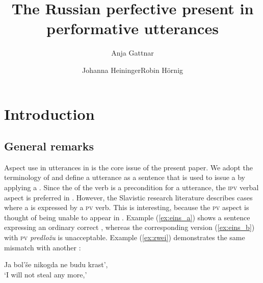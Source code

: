 \documentclass[output=paper,colorlinks,citecolor=brown,newtxmath,hidelinks]{langscibook}
\title{The Russian perfective present in performative utterances}
\author{Anja Gattnar\affiliation{University of Tübingen}\and  Johanna Heininger\affiliation{University of Tübingen}\lastand  Robin Hörnig\affiliation{University of Tübingen}}
\begin{document}
\maketitle
{}
%

\section{Introduction}

\subsection{General remarks}
Aspect use in  utterances in  is the core issue of the present paper. We adopt the terminology of \citet{Eckardt2012} and define a  utterance as a sentence that is used to issue a  by applying a . Since the  of the verb is a precondition for a  utterance, the \textsc{ipv} verbal aspect is preferred in . However, the Slavistic research literature describes cases where a  is expressed by a \textsc{pv} verb. This is interesting, because the \textsc{pv} aspect is thought of being unable to appear in . Example (\ref{ex:eins_a}) shows a sentence expressing an ordinary correct , whereas the corresponding version (\ref{ex:eins_b}) with \textsc{pv} \textit{predložu} is unacceptable. Example (\ref{ex:zwei}) demonstrates the same mismatch with another :

\ea\label{ex:eins}
           \z
\z

\ea\label{ex:zwei} Ja bol’še nikogda ne budu krast',\\‘I will not steal any more,’
           \z
\z
\end{document}
